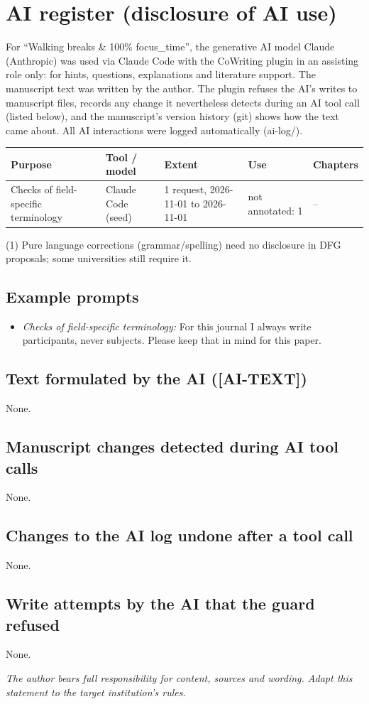 \section*{AI register (disclosure of AI use)}

For “Walking breaks \& 100\% focus\_time”, the generative AI model Claude (Anthropic) was used via Claude Code with the CoWriting plugin in an assisting role only: for hints, questions, explanations and literature support. The manuscript text was written by the author. The plugin refuses the AI's writes to manuscript files, records any change it nevertheless detects during an AI tool call (listed below), and the manuscript's version history (git) shows how the text came about. All AI interactions were logged automatically (ai-log/).

\begin{tabular}{p{.22\linewidth}p{.18\linewidth}p{.2\linewidth}p{.2\linewidth}p{.1\linewidth}}
\hline
\textbf{Purpose} & \textbf{Tool / model} & \textbf{Extent} & \textbf{Use} & \textbf{Chapters} \\
\hline
Checks of field-specific terminology & Claude Code (seed) & 1 request, 2026-11-01 to 2026-11-01 & not annotated: 1 & – \\
\hline
\end{tabular}

\noindent(1) Pure language corrections (grammar/spelling) need no disclosure in DFG proposals; some universities still require it.

\subsection*{Example prompts}
\begin{itemize}
  \item \textit{Checks of field-specific terminology:} For this journal I always write participants, never subjects. Please keep that in mind for this paper.
\end{itemize}
\subsection*{Text formulated by the AI ([AI-TEXT])}
None.
\subsection*{Manuscript changes detected during AI tool calls}
None.
\subsection*{Changes to the AI log undone after a tool call}
None.
\subsection*{Write attempts by the AI that the guard refused}
None.

\textit{The author bears full responsibility for content, sources and wording. Adapt this statement to the target institution's rules.}
